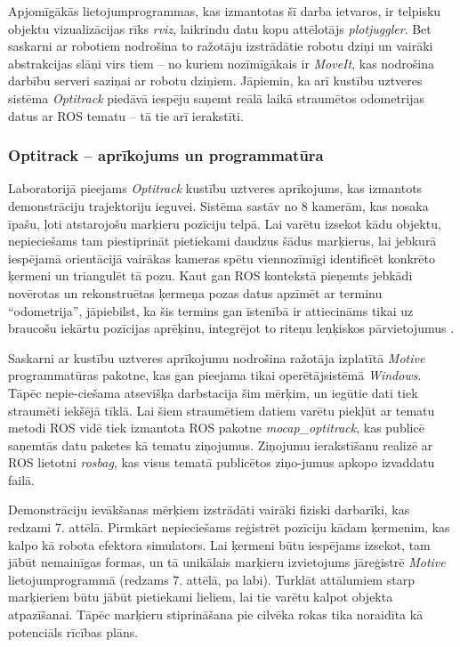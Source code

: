 \documentclass[12pt, a4paper]{article}
\numberwithin{equation}{section} %
\begin{document}
Apjomīgākās lietojumprogrammas, kas izmantotas šī darba ietvaros, ir telpisku objektu vizualizācijas rīks \textit{rviz}, laikrindu datu kopu attēlotājs \textit{plotjuggler}. Bet saskarni ar robotiem nodrošina to ražotāju izstrādātie robotu dziņi un vairāki abstrakcijas slāņi virs tiem -- no kuriem nozīmīgākais ir \textit{MoveIt}, kas nodrošina darbību serveri saziņai ar robotu dziņiem. Jāpiemin, ka arī kustību uztveres sistēma \textit{Optitrack} piedāvā iespēju saņemt reālā laikā straumētos odometrijas datus ar ROS tematu -- tā tie arī ierakstīti.

\subsubsection{Optitrack -- aprīkojums un programmatūra}

Laboratorijā pieejams \textit{Optitrack} kustību uztveres aprīkojums, kas izmantots demonstrāciju trajektoriju ieguvei. Sistēma sastāv no 8 kamerām, kas nosaka īpašu, ļoti atstarojošu marķieru pozīciju telpā. Lai varētu izsekot kādu objektu, nepieciešams tam piestiprināt pietiekami daudzus šādus marķierus, lai jebkurā iespējamā orientācijā vairākas kameras spētu viennozīmīgi identificēt konkrēto ķermeni un triangulēt tā pozu. Kaut gan ROS kontekstā pieņemts jebkādi novērotas un rekonstruētas ķermeņa pozas datus apzīmēt ar terminu ``odometrija'', jāpiebilst, ka šis termins gan īstenībā ir attiecināms tikai uz braucošu iekārtu pozīcijas aprēķinu, integrējot to riteņu leņķiskos pārvietojumus \cite{odometry}.

Saskarni ar kustību uztveres aprīkojumu nodrošina ražotāja izplatītā \textit{Motive} programmatūras pakotne, kas gan pieejama tikai operētājsistēmā \textit{Windows}. Tāpēc nepie-ciešama atsevišķa darbstacija šim mērķim, un iegūtie dati tiek straumēti iekšējā tīklā. Lai šiem straumētiem datiem varētu piekļūt ar tematu metodi ROS vidē tiek izmantota ROS pakotne \textit{mocap\_optitrack}, kas publicē saņemtās datu paketes kā tematu ziņojumus. Ziņojumu ierakstīšanu realizē ar ROS lietotni \textit{rosbag}, kas visus tematā publicētos ziņo-jumus apkopo izvaddatu failā.

Demonstrāciju ievākšanas mērķiem izstrādāti vairāki fiziski darbarīki, kas redzami 7. attēlā. Pirmkārt nepieciešams reģistrēt pozīciju kādam ķermenim, kas kalpo kā robota efektora simulators. Lai ķermeni būtu iespējams izsekot, tam jābūt nemainīgas formas, un tā unikālais marķieru izvietojums jāreģistrē \textit{Motive} lietojumprogrammā (redzams 7. attēlā, pa labi). Turklāt attālumiem starp marķieriem būtu jābūt pietiekami lieliem, lai tie varētu kalpot objekta atpazīšanai. Tāpēc marķieru stiprināšana pie cilvēka rokas tika noraidīta kā potenciāls rīcības plāns. 
\end{document}

